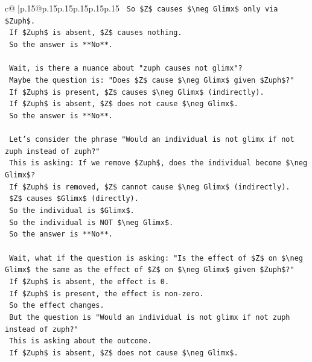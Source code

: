 \documentclass{article}
\begin{document}
{\begin{supertabular}{c@{$\;$}|p{.15\linewidth}@{}p{.15\linewidth}p{.15\linewidth}p{.15\linewidth}p{.15\linewidth}p{.15\linewidth}}
{{{\texttt{    So \$Z\$ causes \$\textbackslash{}neg Glimx\$ only via \$Zuph\$.} \\
\texttt{    If \$Zuph\$ is absent, \$Z\$ causes nothing.} \\
\texttt{    So the answer is **No**.} \\
\\ 
\texttt{    Wait, is there a nuance about "zuph causes not glimx"?} \\
\texttt{    Maybe the question is: "Does \$Z\$ cause \$\textbackslash{}neg Glimx\$ given \$Zuph\$?"} \\
\texttt{    If \$Zuph\$ is present, \$Z\$ causes \$\textbackslash{}neg Glimx\$ (indirectly).} \\
\texttt{    If \$Zuph\$ is absent, \$Z\$ does not cause \$\textbackslash{}neg Glimx\$.} \\
\texttt{    So the answer is **No**.} \\
\\ 
\texttt{    Let's consider the phrase "Would an individual is not glimx if not zuph instead of zuph?"} \\
\texttt{    This is asking: If we remove \$Zuph\$, does the individual become \$\textbackslash{}neg Glimx\$?} \\
\texttt{    If \$Zuph\$ is removed, \$Z\$ cannot cause \$\textbackslash{}neg Glimx\$ (indirectly).} \\
\texttt{    \$Z\$ causes \$Glimx\$ (directly).} \\
\texttt{    So the individual is \$Glimx\$.} \\
\texttt{    So the individual is NOT \$\textbackslash{}neg Glimx\$.} \\
\texttt{    So the answer is **No**.} \\
\\ 
\texttt{    Wait, what if the question is asking: "Is the effect of \$Z\$ on \$\textbackslash{}neg Glimx\$ the same as the effect of \$Z\$ on \$\textbackslash{}neg Glimx\$ given \$Zuph\$?"} \\
\texttt{    If \$Zuph\$ is absent, the effect is 0.} \\
\texttt{    If \$Zuph\$ is present, the effect is non{-}zero.} \\
\texttt{    So the effect changes.} \\
\texttt{    But the question is "Would an individual is not glimx if not zuph instead of zuph?"} \\
\texttt{    This is asking about the outcome.} \\
\texttt{    If \$Zuph\$ is absent, \$Z\$ does not cause \$\textbackslash{}neg Glimx\$.} \\
}}}
\end{supertabular}}
\end{document}
